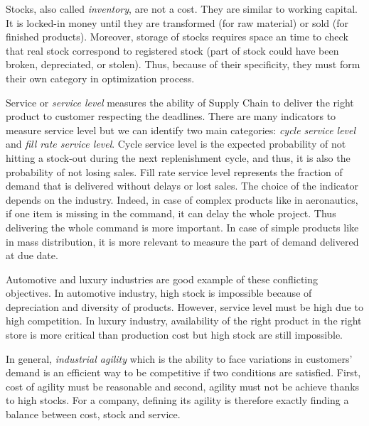 Stocks, also called \emph{inventory}, are not  a cost.
They are similar to working capital.
It is locked-in money until they are transformed (for raw material) or sold (for finished products).
Moreover, storage of stocks  requires space an time to check that real stock correspond to registered stock (part of stock could have been broken, depreciated, or stolen).
Thus, because of their specificity, they must form their own category in optimization process.

Service or \emph{service level} measures the ability of Supply Chain to deliver the right product to customer respecting the deadlines.
There are many indicators to measure service level but we can identify two main categories: \emph{cycle service level} and \emph{fill rate service level}.
Cycle service level is the expected probability of not hitting a stock-out during the next replenishment cycle, and thus, it is also the probability of not losing sales.
Fill rate service level represents the fraction of demand that is delivered without delays or lost sales.
The choice of the indicator depends on the industry.
Indeed, in case of complex products like in aeronautics, if one item is missing in the command, it can delay the whole project.
Thus delivering the whole command is more important. 
In case of simple products like in mass distribution, it is more relevant to measure the part of demand delivered at due date. 


\medskip


Automotive and luxury industries are good example of these conflicting objectives.
In automotive industry, high stock is impossible because of depreciation and diversity of products.
However, service level must be high due to high competition.
In luxury industry, availability of the right product in the right store is more critical than production cost but high stock are still impossible.


In general, \emph{industrial agility} which is the ability to face variations in customers' demand is an efficient way to be competitive if two conditions are satisfied.
First, cost of agility must be reasonable and second, agility must not be achieve thanks to high stocks.
For a company, defining its agility is therefore exactly finding a balance between cost, stock and service.


